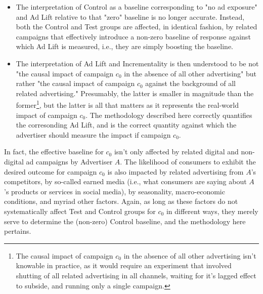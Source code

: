 \documentclass[11pt,a4paper]{article}
\theoremstyle{definition}
\theoremstyle{remark}
\theoremstyle{definition}
\theoremstyle{definition}
\theoremstyle{definition}
\theoremstyle{definition}
\theoremstyle{definition}
\theoremstyle{definition}
\begin{document}
\begin{itemize}
	\item The interpretation of Control as a baseline corresponding to "no ad exposure" and Ad Lift relative to that "zero" baseline is no longer accurate. Instead, both the Control and Test groups are affected, in identical fashion, by related campaigns that effectively introduce a non-zero baseline of response against which Ad Lift is measured, i.e., they are simply boosting the baseline. 
	\item The interpretation of Ad Lift and Incrementality is then understood to be not "the causal impact of campaign $c_0$ in the absence of all other advertising" but rather "the causal impact of campaign $c_0$ against the background of all related advertising." Presumably, the latter is smaller in magnitude than the former\footnote{The causal impact of campaign $c_0$ in the absence of all other advertising isn't knowable in practice, as it would require an experiment that involved shutting of all related advertising in all channels, waiting for it's lagged effect to subside, and running only a single campaign.}, but the latter is all that matters as it represents the real-world impact of campaign $c_0$. The methodology described here correctly quantifies the corresonding Ad Lift, and is the correct quantity against which the advertiser should measure the impact if campaign $c_0$. 
\end{itemize}

In fact, the effective baseline for $c_0$ isn't only affected by related digital and non-digital ad campaigns by Advertiser $A$. The likelihood of consumers to exhibit the desired outcome for campaign $c_0$ is also impacted by  related advertising from $A$'s competitors, by so-called earned media (i.e., what consumers are saying about $A$'s products or services in social media), by seasonality, macro-economic conditions, and myriad other factors. Again, as long as these factors do not systematically affect Test and Control groups for $c_0$ in different ways, they merely serve to determine the (non-zero) Control baseline, and the methodology here pertains. 
\end{document}
